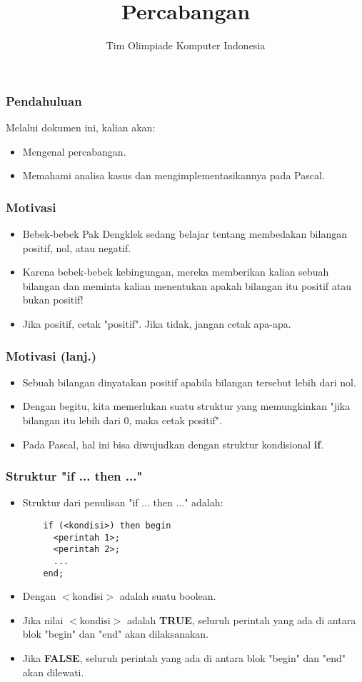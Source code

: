 

\title{Percabangan}
\author{Tim Olimpiade Komputer Indonesia}
\date{}



\begin{frame}
\titlepage
\end{frame}

\begin{frame}
\frametitle{Pendahuluan}
Melalui dokumen ini, kalian akan:
\begin{itemize}
  \item Mengenal percabangan.
  \item Memahami analisa kasus dan mengimplementasikannya pada Pascal.
\end{itemize}
\end{frame}

\begin{frame}
\frametitle{Motivasi}
\begin{itemize}
  \item Bebek-bebek Pak Dengklek sedang belajar tentang membedakan bilangan positif, nol, atau negatif.
  \item Karena bebek-bebek kebingungan, mereka memberikan kalian sebuah bilangan dan meminta kalian menentukan apakah bilangan itu positif atau bukan positif!
  \item Jika positif, cetak "positif". Jika tidak, jangan cetak apa-apa.
\end{itemize}
\end{frame}

\begin{frame}
\frametitle{Motivasi (lanj.)}
\begin{itemize}
  \item Sebuah bilangan dinyatakan positif apabila bilangan tersebut lebih dari nol.
  \item Dengan begitu, kita memerlukan suatu struktur yang memungkinkan "\alert{jika} bilangan itu lebih dari 0, \alert{maka} cetak positif".
  \item Pada Pascal, hal ini bisa diwujudkan dengan struktur kondisional \alert{\textbf{if}}.
\end{itemize}
\end{frame}

\begin{frame}[fragile]
\frametitle{Struktur "if ... then ..."}
\begin{itemize}
  \item Struktur dari penulisan "if ... then ..." adalah:
  \begin{lstlisting}
    if (<kondisi>) then begin
      <perintah 1>;
      <perintah 2>;
      ...
    end;
  \end{lstlisting}

  \item Dengan $<$kondisi$>$ adalah suatu boolean.
  \item Jika nilai $<$kondisi$>$ adalah \textbf{TRUE}, seluruh perintah yang ada di antara blok "begin" dan "end" akan dilaksanakan.
  \item Jika \textbf{FALSE}, seluruh perintah yang ada di antara blok "begin" dan "end" akan dilewati.
\end{itemize}
\end{frame}

